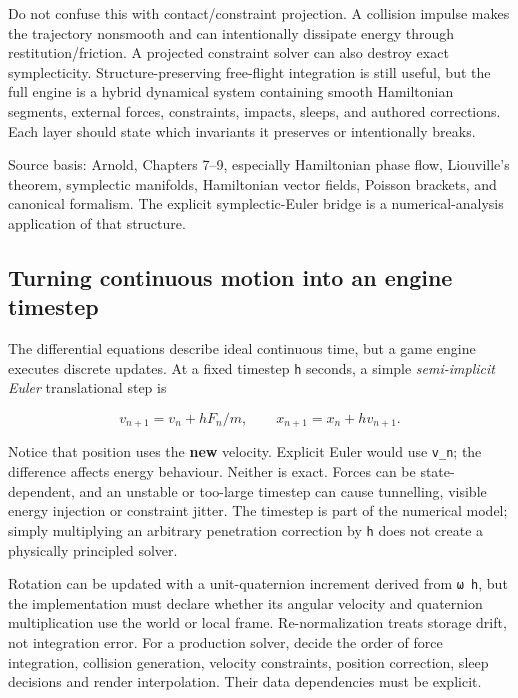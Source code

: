 Do not confuse this with contact/constraint projection. A collision impulse makes the trajectory nonsmooth and can intentionally dissipate energy through restitution/friction. A projected constraint solver can also destroy exact symplecticity. Structure-preserving free-flight integration is still useful, but the full engine is a hybrid dynamical system containing smooth Hamiltonian segments, external forces, constraints, impacts, sleeps, and authored corrections. Each layer should state which invariants it preserves or intentionally breaks.

Source basis: Arnold, Chapters 7--9, especially Hamiltonian phase flow, Liouville's theorem, symplectic manifolds, Hamiltonian vector fields, Poisson brackets, and canonical formalism. The explicit symplectic-Euler bridge is a numerical-analysis application of that structure.

\subsection{Turning continuous motion into an engine timestep}\label{06-engine-ii-ch033-turning-continuous-motion-into-an-engine-timestep}

\hypertarget{06-engine-ii-ch033-turning-continuous-motion-into-an-engine-timestep}{}

The differential equations describe ideal continuous time, but a game engine executes discrete updates. At a fixed timestep \texttt{h} seconds, a simple \emph{semi-implicit Euler} translational step is

\[
v_{n+1}=v_n+h F_n/m,\qquad x_{n+1}=x_n+h v_{n+1}.
\]

Notice that position uses the \textbf{new} velocity. Explicit Euler would use \texttt{v\_n}; the difference affects energy behaviour. Neither is exact. Forces can be state-dependent, and an unstable or too-large timestep can cause tunnelling, visible energy injection or constraint jitter. The timestep is part of the numerical model; simply multiplying an arbitrary penetration correction by \texttt{h} does not create a physically principled solver.

Rotation can be updated with a unit-quaternion increment derived from \texttt{ω\ h}, but the implementation must declare whether its angular velocity and quaternion multiplication use the world or local frame. Re-normalization treats storage drift, not integration error. For a production solver, decide the order of force integration, collision generation, velocity constraints, position correction, sleep decisions and render interpolation. Their data dependencies must be explicit.

